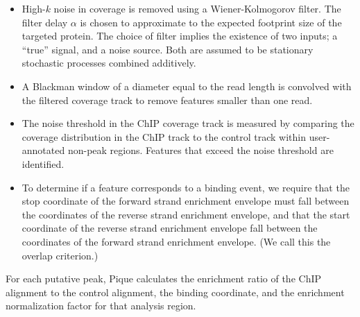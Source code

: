 \documentclass{bioinfo}
\begin{document}
\begin{methods}
\begin{itemize}
\item High-$k$ noise in coverage is removed using a Wiener-Kolmogorov
  filter. The filter delay $\alpha$ is chosen to approximate to the
  expected footprint size of the targeted protein. The choice of
  filter implies the existence of two inputs; a ``true'' signal, and a
  noise source. Both are assumed to be stationary stochastic processes
  combined additively.


\item A Blackman window of a diameter equal to the read length is
  convolved with the filtered coverage track to remove features
  smaller than one read. 

\item The noise threshold in the ChIP coverage track is measured by
  comparing the coverage distribution in the ChIP track to the control
  track within user-annotated non-peak regions. Features that exceed
  the noise threshold are identified.

\item To determine if a feature corresponds to a binding event, we
  require that the stop coordinate of the forward strand enrichment
  envelope must fall between the coordinates of the reverse strand
  enrichment envelope, and that the start coordinate of the reverse
  strand enrichment envelope fall between the coordinates of the
  forward strand enrichment envelope. (We call this the overlap
  criterion.)

\end{itemize}


\noindent For each putative peak, Pique calculates the enrichment
ratio of the ChIP alignment to the control alignment, the binding
coordinate, and the enrichment normalization factor for that analysis
region. 

\end{methods}
\end{document}
